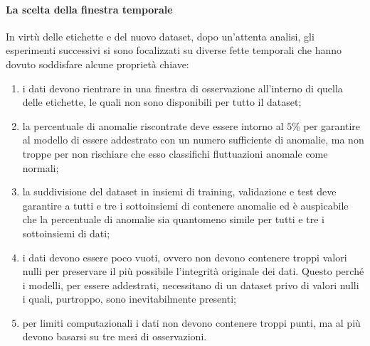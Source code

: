     
    \paragraph{La scelta della finestra temporale} In virtù delle etichette e del nuovo dataset, dopo un'attenta analisi, 
    gli esperimenti successivi si sono focalizzati su diverse fette temporali che hanno dovuto soddisfare alcune proprietà
    chiave:
    \begin{enumerate}
        \item i dati devono rientrare in una finestra di osservazione all'interno di quella delle etichette, 
              le quali non sono disponibili per tutto il dataset;
        \item la percentuale di anomalie riscontrate deve essere intorno al $5\%$ per garantire al modello di essere addestrato 
              con un numero sufficiente di anomalie, ma non troppe per non rischiare che esso classifichi fluttuazioni anomale 
              come normali;
        \item la suddivisione del dataset in insiemi di training, validazione e test deve garantire a tutti e tre i 
              sottoinsiemi di contenere anomalie ed è auspicabile che la percentuale di anomalie sia quantomeno 
              simile per tutti e tre i sottoinsiemi di dati;
        \item i dati devono essere poco vuoti, ovvero non devono contenere troppi valori nulli per 
              preservare il più possibile l'integrità originale dei dati. Questo perché i modelli, per essere addestrati, 
              necessitano di un dataset privo di valori nulli i quali, purtroppo, sono inevitabilmente presenti;
        \item per limiti computazionali i dati non devono contenere troppi punti, ma al più devono basarsi su tre mesi 
              di osservazioni.
    \end{enumerate}
    
